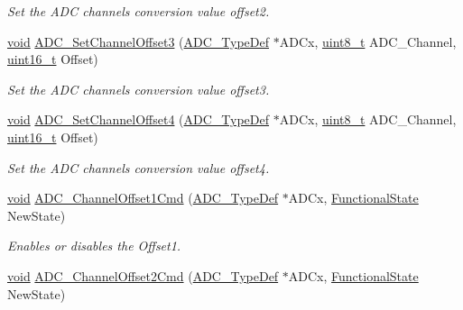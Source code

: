 \begin{DoxyCompactItemize}
\begin{DoxyCompactList}\small\item\em Set the A\-D\-C channels conversion value offset2. \end{DoxyCompactList}\item 
\hyperlink{group___n_a_m_e_ga18028b8badbf1ea7e704ccac3c488e82}{void} \hyperlink{group___a_d_c___group4_ga28b79ee61642eb26f91732592ae911df}{A\-D\-C\-\_\-\-Set\-Channel\-Offset3} (\hyperlink{struct_a_d_c___type_def}{A\-D\-C\-\_\-\-Type\-Def} $\ast$A\-D\-Cx, \hyperlink{stdint_8h_aba7bc1797add20fe3efdf37ced1182c5}{uint8\-\_\-t} A\-D\-C\-\_\-\-Channel, \hyperlink{stdint_8h_a273cf69d639a59973b6019625df33e30}{uint16\-\_\-t} Offset)
\begin{DoxyCompactList}\small\item\em Set the A\-D\-C channels conversion value offset3. \end{DoxyCompactList}\item 
\hyperlink{group___n_a_m_e_ga18028b8badbf1ea7e704ccac3c488e82}{void} \hyperlink{group___a_d_c___group4_ga331ec41f03611b841535f9f6fde56aee}{A\-D\-C\-\_\-\-Set\-Channel\-Offset4} (\hyperlink{struct_a_d_c___type_def}{A\-D\-C\-\_\-\-Type\-Def} $\ast$A\-D\-Cx, \hyperlink{stdint_8h_aba7bc1797add20fe3efdf37ced1182c5}{uint8\-\_\-t} A\-D\-C\-\_\-\-Channel, \hyperlink{stdint_8h_a273cf69d639a59973b6019625df33e30}{uint16\-\_\-t} Offset)
\begin{DoxyCompactList}\small\item\em Set the A\-D\-C channels conversion value offset4. \end{DoxyCompactList}\item 
\hyperlink{group___n_a_m_e_ga18028b8badbf1ea7e704ccac3c488e82}{void} \hyperlink{group___a_d_c___group4_ga099ca28e280598501ac43ebbb1dfb27e}{A\-D\-C\-\_\-\-Channel\-Offset1\-Cmd} (\hyperlink{struct_a_d_c___type_def}{A\-D\-C\-\_\-\-Type\-Def} $\ast$A\-D\-Cx, \hyperlink{group___exported__types_gac9a7e9a35d2513ec15c3b537aaa4fba1}{Functional\-State} New\-State)
\begin{DoxyCompactList}\small\item\em Enables or disables the Offset1. \end{DoxyCompactList}\item 
\hyperlink{group___n_a_m_e_ga18028b8badbf1ea7e704ccac3c488e82}{void} \hyperlink{group___a_d_c___group4_gaca526bb6eeb80d041a24faffc6894e91}{A\-D\-C\-\_\-\-Channel\-Offset2\-Cmd} (\hyperlink{struct_a_d_c___type_def}{A\-D\-C\-\_\-\-Type\-Def} $\ast$A\-D\-Cx, \hyperlink{group___exported__types_gac9a7e9a35d2513ec15c3b537aaa4fba1}{Functional\-State} New\-State)

\end{DoxyCompactItemize}
